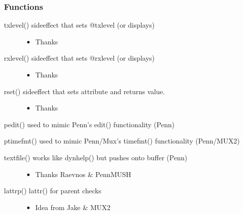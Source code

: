 \documentclass[letterpaper,10pt,english]{sphinxmanual}
\begin{document}
\subsubsection{Functions}
\label{\detokenize{changelog:id20}}\begin{description}
\item[{txlevel() \sphinxhyphen{} sideeffect that sets @txlevel (or displays)}] \leavevmode\begin{itemize}
\item {} 
\sphinxAtStartPar
Thanks 

\end{itemize}

\item[{rxlevel() \sphinxhyphen{} sideeffect that sets @rxlevel (or displays)}] \leavevmode\begin{itemize}
\item {} 
\sphinxAtStartPar
Thanks 

\end{itemize}

\item[{rset() \sphinxhyphen{} sideeffect that sets attribute and returns value.}] \leavevmode\begin{itemize}
\item {} 
\sphinxAtStartPar
Thanks 

\end{itemize}

\end{description}

\sphinxAtStartPar
pedit() \sphinxhyphen{} used to mimic Penn’s edit() functionality (Penn)

\sphinxAtStartPar
ptimefmt() \sphinxhyphen{} used to mimic Penn/Mux’s timefmt() functionality (Penn/MUX2)
\begin{description}
\item[{textfile() \sphinxhyphen{} works like dynhelp() but pushes onto buffer (Penn)}] \leavevmode\begin{itemize}
\item {} 
\sphinxAtStartPar
Thanks Raevnos \& PennMUSH

\end{itemize}

\item[{lattrp() \sphinxhyphen{} lattr() for parent checks}] \leavevmode\begin{itemize}
\item {} 
\sphinxAtStartPar
Idea from Jake \& MUX2

\end{itemize}

\end{description}
\end{document}
